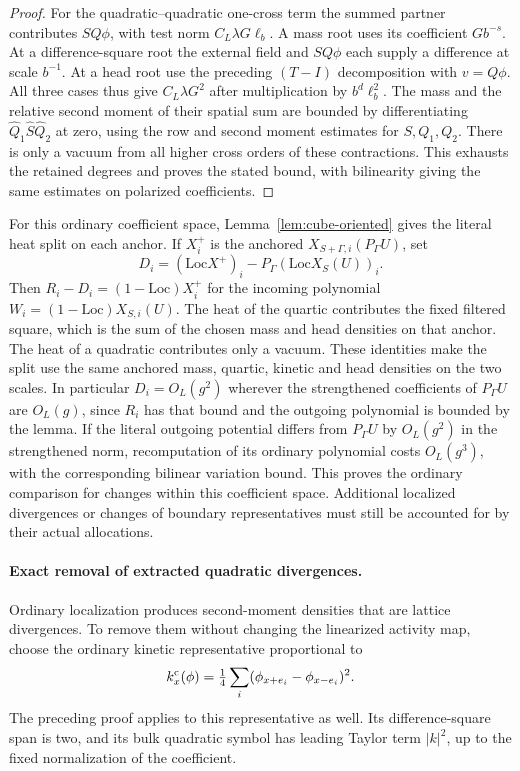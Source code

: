 \documentclass[11pt]{article}
\theoremstyle{definition}
\begin{document}
\begin{proof}
For the quadratic--quadratic one-cross term the summed
partner contributes \(SQ\phi\), with test norm
\(C_L\lambda G\ell_b\). A mass root uses its coefficient
\(G b^{-s}\). At a difference-square root the external
field and \(SQ\phi\) each supply a difference at scale
\(b^{-1}\). At a head root use the preceding
\((T-I)\) decomposition with \(v=Q\phi\). All three
cases thus give \(C_L\lambda G^2\) after multiplication
by \(b^d\ell_b^2\). The mass and the relative second
moment of their spatial sum are bounded by differentiating
\(\widehat Q_1\widehat S\widehat Q_2\) at zero, using the
row and second moment estimates for \(S,Q_1,Q_2\).
There is only a vacuum from all higher cross orders
of these contractions. This exhausts the retained degrees
and proves the stated bound, with bilinearity giving the
same estimates on polarized coefficients.
\end{proof}

For this ordinary coefficient space, Lemma~\ref{lem:cube-oriented}
gives the literal heat split on each anchor. If \(X_i^+\) is
the anchored \(X_{S+\Gamma,i}(P_\Gamma U)\), set
\begin{equation}
 D_i=(\mathrm{Loc}X^+)_i
             -P_\Gamma(\mathrm{Loc}X_S(U))_i.
\end{equation}
Then \(R_i-D_i=(1-\mathrm{Loc})X_i^+\) for the incoming
polynomial \(W_i=(1-\mathrm{Loc})X_{S,i}(U)\). The heat of the
quartic contributes the fixed filtered square, which is the
sum of the chosen mass and head densities on that anchor.
The heat of a quadratic contributes only a vacuum. These
identities make the split use the same anchored mass, quartic,
kinetic and head densities on the two scales. In particular
\(D_i=O_L(g^2)\) wherever the strengthened coefficients of
\(P_\Gamma U\) are \(O_L(g)\), since \(R_i\) has that bound
and the outgoing polynomial is bounded by the lemma.
If the literal outgoing potential differs from \(P_\Gamma U\)
by \(O_L(g^2)\) in the strengthened norm, recomputation
of its ordinary polynomial costs \(O_L(g^3)\), with
the corresponding bilinear variation bound. This proves
the ordinary comparison for changes within this coefficient
space. Additional localized divergences or changes of
boundary representatives must still be accounted for
by their actual allocations.

\paragraph{Exact removal of extracted quadratic divergences.}
Ordinary localization produces second-moment densities that are
lattice divergences. To remove them without changing the linearized
activity map, choose the ordinary kinetic representative proportional
to
\begin{equation}
 k_x^{\rm c}(\phi)
   =\tfrac14\sum_i(\phi_{x+e_i}-\phi_{x-e_i})^2 .
\end{equation}
The preceding proof applies to this representative as well. Its
difference-square span is two, and its bulk quadratic symbol has
leading Taylor term \(|k|^2\), up to the fixed normalization of
the coefficient.
\end{document}
